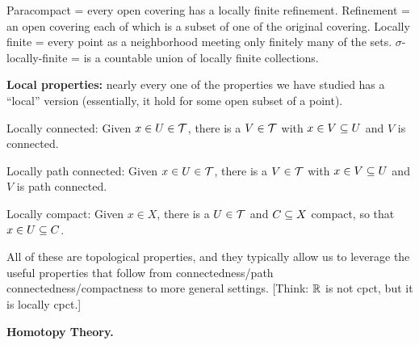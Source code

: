 \documentclass[12pt]{article}
\begin{document}
\ssk

Paracompact = every open covering has a locally finite refinement. 
Refinement = an open covering each of which is a subset of one of the original covering.
Locally finite = every point as a neighborhood meeting only finitely many of the sets.
$\sigma$-locally-finite = is a countable union of locally finite collections.

\msk

{\bf Local properties:} nearly every one of the properties we have studied has a 
``local'' version (essentially, it hold for some open subset of a point).

\ssk

Locally connected: Given $x\in U\in{\mathcal T}$, there is a $V\in{\mathcal T}$ with $x\in V\subseteq U$ and $V$ is 
connected.

\ssk

Locally path connected: Given $x\in U\in{\mathcal T}$, there is a $V\in{\mathcal T}$ with $x\in V\subseteq U$ and $V$ is 
path connected.

\ssk

Locally compact: Given $x\in X$, there is a $U\in{\mathcal T}$ and $C\subseteq X$ compact, so that
$x\in U\subseteq C$.

\ssk

All of these are topological properties, and they typically allow us to leverage
the useful properties that follow from connectedness/path connectedness/compactness
to more general settings. [Think: ${\mathbb R}$ is not cpct, but it is locally cpct.]

\msk

{\bf Homotopy Theory.}

\ssk



\vfill
\end{document}
